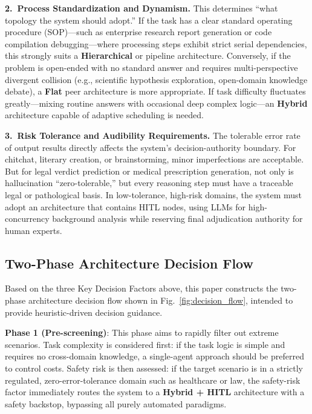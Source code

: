\textbf{2.\ Process Standardization and Dynamism.}
This determines ``what topology the system should adopt.''
If the task has a clear standard operating procedure (SOP)---such as
enterprise research report generation or code compilation debugging---where
processing steps exhibit strict serial dependencies, this strongly
suits a \textbf{Hierarchical} or pipeline architecture.
Conversely, if the problem is open-ended with no standard answer and
requires multi-perspective divergent collision (e.g., scientific hypothesis
exploration, open-domain knowledge debate), a \textbf{Flat} peer
architecture is more appropriate.
If task difficulty fluctuates greatly---mixing routine answers with
occasional deep complex logic---an \textbf{Hybrid} architecture capable
of adaptive scheduling is needed.

\textbf{3.\ Risk Tolerance and Audibility Requirements.}
The tolerable error rate of output results directly affects the system's
decision-authority boundary.
For chitchat, literary creation, or brainstorming, minor imperfections
are acceptable.
But for legal verdict prediction or medical prescription generation,
not only is hallucination ``zero-tolerable,'' but every reasoning step
must have a traceable legal or pathological basis.
In low-tolerance, high-risk domains, the system must adopt an architecture
that contains HITL nodes, using LLMs for high-concurrency background
analysis while reserving final adjudication authority for human experts.

\subsection{Two-Phase Architecture Decision Flow}
\label{sec:two_phase}

Based on the three Key Decision Factors above, this paper constructs the
two-phase architecture decision flow shown in Fig.~\ref{fig:decision_flow},
intended to provide heuristic-driven decision guidance.

\textbf{Phase 1 (Pre-screening)}: This phase aims to rapidly filter out
extreme scenarios.
Task complexity is considered first: if the task logic is simple and
requires no cross-domain knowledge, a single-agent approach should be
preferred to control costs.
Safety risk is then assessed: if the target scenario is in a
strictly regulated, zero-error-tolerance domain such as healthcare or
law, the safety-risk factor immediately routes the system to a
\textbf{Hybrid + HITL} architecture with a safety backstop, bypassing
all purely automated paradigms.

